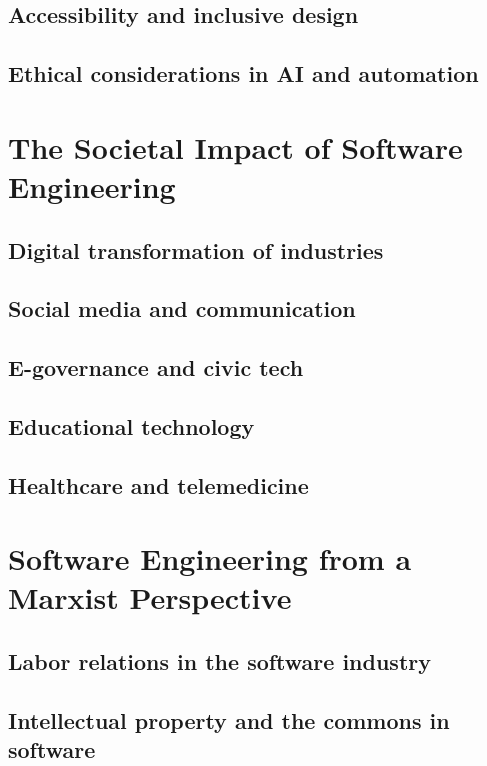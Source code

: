 \begin{refsection}
\begin{multicols}{2}
\subsection{Accessibility and inclusive design}
\subsection{Ethical considerations in AI and automation}
\end{multicols}

\newpage

\section{The Societal Impact of Software Engineering}
\begin{multicols}{2}
\subsection{Digital transformation of industries}
\subsection{Social media and communication}
\subsection{E-governance and civic tech}
\subsection{Educational technology}
\subsection{Healthcare and telemedicine}
\end{multicols}

\newpage

\section{Software Engineering from a Marxist Perspective}
\begin{multicols}{2}
\subsection{Labor relations in the software industry}
\subsection{Intellectual property and the commons in software}

\end{multicols}
\end{refsection}
